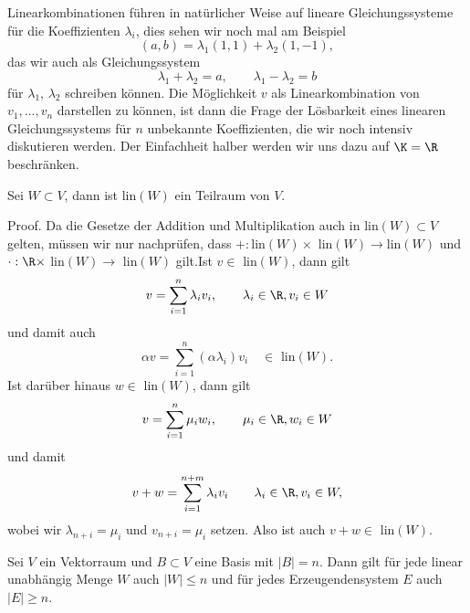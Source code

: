 Linearkombinationen führen in natürlicher Weise auf lineare Gleichungssysteme für die Koeffizienten \(\lambda_i\), dies sehen wir noch mal am Beispiel
\begin{equation*}
 (a,b) = \lambda_1 (1,1) + \lambda_2 (1,-1),
\end{equation*}
das wir auch  als Gleichungssystem
\begin{equation*}
 \lambda_1 + \lambda_2 = a, \qquad \lambda_1 - \lambda_2 = b
\end{equation*}
für \(\lambda_1\), \(\lambda_2\) schreiben können. Die Möglichkeit \(v\) als Linearkombination von \(v_1, \ldots,v_n\) darstellen zu können, ist dann die Frage der Lösbarkeit eines linearen Gleichungssystems für \(n\) unbekannte Koeffizienten, die wir noch intensiv diskutieren werden. Der Einfachheit halber werden wir uns dazu auf \(\K=\R\) beschränken.
\label{vektorraeume/vektorraeume:theorem-9}
\begin{theorem}{}{}



Sei \(W \subset V\), dann ist lin\((W)\) ein Teilraum von \(V\).
\end{theorem}

\begin{emphBox}{}{}
Proof.  Da die Gesetze der Addition und Multiplikation auch in lin\((W) \subset V\) gelten, müssen wir nur nachprüfen, dass \(+:\)lin\((W) \times\) lin\((W) \rightarrow \)lin\((W)\) und \(\cdot:\R \times\) lin\((W) \rightarrow\) lin\((W)\) gilt.Ist \(v \in \) lin\((W)\), dann gilt
\begin{equation*}
 v = \sum_{i=1}^n \lambda_i v_i, \qquad \lambda_i \in \R, v_i \in W
\end{equation*}
und
damit auch
\begin{equation*}
 \alpha v = \sum_{i=1}^n (\alpha \lambda_i) v_i \quad \in \text{ lin}(W).
\end{equation*}
Ist darüber hinaus \(w \in \) lin\((W)\), dann gilt
\begin{equation*}
 v = \sum_{i=1}^n \mu_i w_i, \qquad \mu_i \in \R, w_i \in W
\end{equation*}
und
damit
\begin{equation*}
 v+ w = \sum_{i=1}^{n+m} \lambda_i v_i \qquad \lambda_i \in \R, v_i \in W,
\end{equation*}
wobei wir \(\lambda_{n+i} = \mu_i\) und \(v_{n+i} = \mu_i\) setzen. Also ist auch \(v+w \in \) lin\((W)\).
\end{emphBox}
\label{vektorraeume/vektorraeume:theorem-10}
\begin{theorem}{}{}



Sei \(V\) ein Vektorraum und \(B \subset V\) eine Basis mit \(|B|=n\). Dann gilt für jede linear unabhängig Menge \(W\) auch \(|W| \leq n\) und für jedes Erzeugendensystem \(E\) auch \(|E| \geq n\).
\end{theorem}

